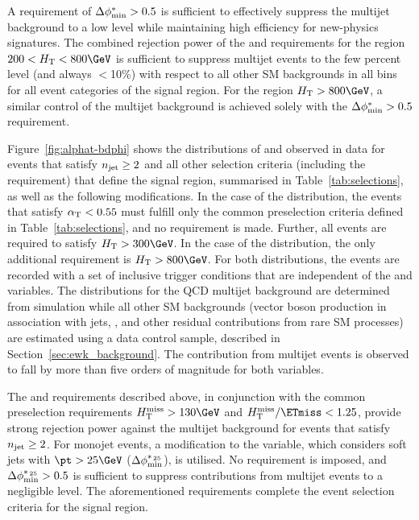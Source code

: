 A requirement of $\Delta\phi^{*}_\text{min} > 0.5$ is sufficient to effectively suppress
the multijet background to a low level while maintaining high
efficiency for new-physics signatures. The combined rejection power of
the \alphat and \bdphi requirements for the region $200 < \scalht <
800\GeV$ is sufficient to suppress multijet events to the few percent
level (and always $<$10\%) with respect to all other SM backgrounds in
all \scalht bins for all event categories of the signal region. For
the region $\scalht > 800\GeV$, a similar control of the multijet
background is achieved solely with the $\Delta\phi^{*}_\text{min} > 0.5$ requirement.

Figure~\ref{fig:alphat-bdphi} shows the distributions of \alphat and
\bdphi observed in data for events that satisfy $n_{\text{jet}} \geq 2$ and all
other selection criteria (including the \bdphi requirement) that
define the signal region, summarised in Table~\ref{tab:selections}, as
well as the following modifications.  In the case of the \alphat
distribution, the events that satisfy $\alpha_{\mathrm{T}} < 0.55$ must fulfill
only the common preselection criteria defined in
Table~\ref{tab:selections}, and no \HTmiss requirement is
made. Further, all events are required to satisfy $\scalht >
300\GeV$. In the case of the \bdphi distribution, the only additional
requirement is $\scalht > 800\GeV$. For both distributions, the events
are recorded with a set of inclusive trigger conditions that are
independent of the \alphat and \bdphi variables. The distributions for
the QCD multijet background are determined from simulation while all
other SM backgrounds (vector boson production in association with
jets, \ttbar, and other residual contributions from rare SM processes)
are estimated using a \mj data control sample, described in
Section~\ref{sec:ewk_background}. The contribution from multijet
events is observed to fall by more than five orders of magnitude for
both variables.

The \alphat and \bdphi requirements described above, in conjunction
with the common preselection requirements $\HTmiss > 130\GeV$ and
$\HTmiss / \ETmiss < 1.25$, provide strong rejection power against the
multijet background for events that satisfy $n_{\text{jet}} \geq 2$. For
monojet events, a modification to the \bdphi variable, which considers
soft jets with $\pt > 25\GeV$ ($\Delta\phi^{*_{\, 25}}_\text{min}$), is utilised. No \alphat
requirement is imposed, and $\Delta\phi^{*_{\, 25}}_\text{min} > 0.5$ is sufficient to
suppress contributions from multijet events to a negligible level.
The aforementioned requirements complete the event selection criteria
for the signal region.

